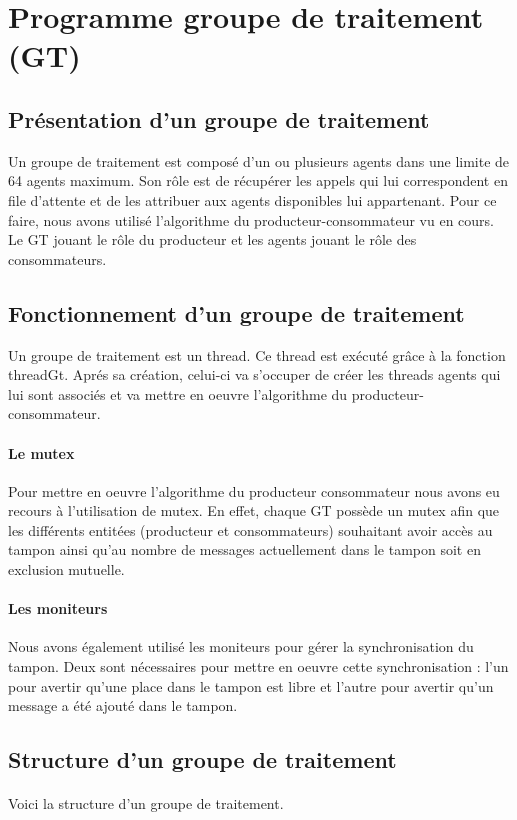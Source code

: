\documentclass{report}
\begin{document}
	\section{Programme groupe de traitement (GT)}
		\subsection{Présentation d'un groupe de traitement}
			Un groupe de traitement est composé d'un ou plusieurs agents dans une limite de 64 agents maximum. Son rôle est de récupérer les appels qui lui correspondent en file d'attente et de les attribuer aux agents disponibles lui appartenant. Pour ce faire, nous avons utilisé l'algorithme du producteur-consommateur vu en cours. Le GT jouant le rôle du producteur et les agents jouant le rôle des consommateurs.
		\subsection{Fonctionnement d'un groupe de traitement}
			Un groupe de traitement est un thread. Ce thread est exécuté grâce à la fonction threadGt. Aprés sa création, celui-ci va s'occuper de créer les threads agents qui lui sont associés et va mettre en oeuvre l'algorithme du producteur-consommateur.
			\paragraph{Le mutex}
				Pour mettre en oeuvre l'algorithme du producteur consommateur nous avons eu recours à l'utilisation de mutex. En effet, chaque GT possède un mutex afin que les différents entitées (producteur et consommateurs) souhaitant avoir accès au tampon ainsi qu'au nombre de messages actuellement dans le tampon soit en exclusion mutuelle. 
			\paragraph{Les moniteurs}
				Nous avons également utilisé les moniteurs pour gérer la synchronisation du tampon. Deux sont nécessaires pour mettre en oeuvre cette synchronisation : l'un pour avertir qu'une place dans le tampon est libre et l'autre pour avertir qu'un message a été ajouté dans le tampon. 
		\subsection{Structure d'un groupe de traitement}
			\paragraph{}
				Voici la structure d'un groupe de traitement.
\end{document}
